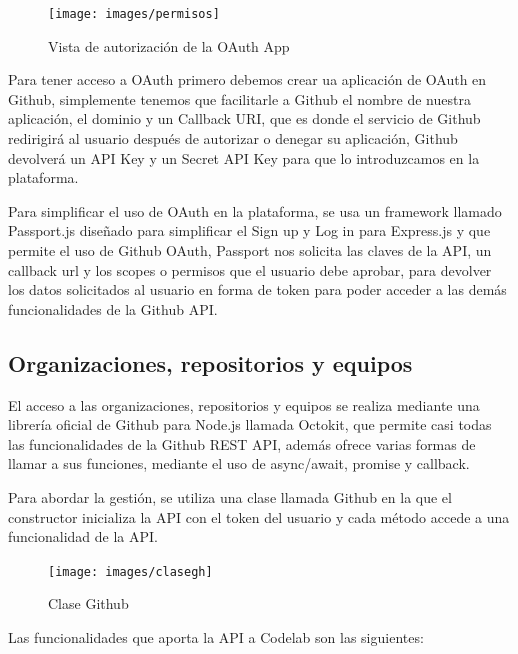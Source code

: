 \begin{figure}[!th]
\begin{center}
\texttt{[image: images/permisos]}
\caption{Vista de autorización de la OAuth App}
\label{fig:Vista de la OAuth App}
\end{center}
\end{figure}

Para tener acceso a OAuth primero debemos crear ua aplicación de OAuth en Github, simplemente tenemos que facilitarle a Github el nombre de nuestra aplicación, el dominio y un Callback URI, que es donde el servicio de Github redirigirá al usuario después de autorizar o denegar su aplicación,
Github devolverá un API Key y un Secret API Key para que lo introduzcamos en la plataforma. 

Para simplificar el uso de OAuth en la plataforma, se usa un framework llamado Passport.js diseñado para simplificar el Sign up y Log in para Express.js y que permite el uso de Github OAuth, 
Passport nos solicita las claves de la API, un callback url y los scopes o permisos que el usuario debe aprobar, para devolver los datos solicitados al usuario en forma de token para poder acceder a las demás funcionalidades de la Github API.

\subsection{Organizaciones, repositorios y equipos}
\label{3:2:2}

El acceso a las organizaciones, repositorios y equipos se realiza mediante una librería oficial de Github para Node.js
llamada Octokit, que permite casi todas las funcionalidades de la Github REST API, además ofrece varias formas de llamar a sus funciones, mediante 
el uso de async/await, promise y callback.

Para abordar la gestión, se utiliza una clase llamada Github en la que el constructor inicializa la API con el token del usuario y cada método accede a una funcionalidad de la API.

\begin{figure}[!th]
\begin{center}
\texttt{[image: images/clasegh]}
\caption{Clase Github}
\label{fig:Clase Github}
\end{center}
\end{figure}

Las funcionalidades que aporta la API a Codelab son las siguientes:

